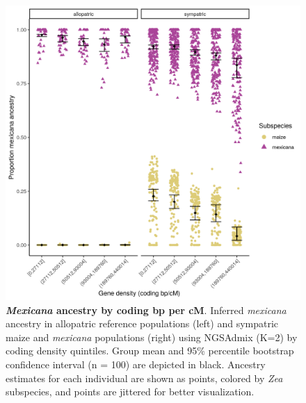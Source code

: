 \begin{figure}[ht]
\includegraphics[width=\textwidth]{chapter2/figures/K2_by_cd_bootstrap_sympatric_and_allopatric.png}
\caption{\color{Gray} \textbf{\textit{Mexicana} ancestry by coding bp per cM}. Inferred \textit{mexicana} ancestry in  allopatric reference populations (left) and sympatric maize and \textit{mexicana} populations (right) using NGSAdmix (K=2) by coding density quintiles. Group mean and 95\% percentile bootstrap confidence interval (n = 100) are depicted in black. Ancestry estimates for each individual are shown as points, colored by \textit{Zea} subspecies, and points are jittered for better visualization.}
\label{K2_by_cd}
\end{figure}


